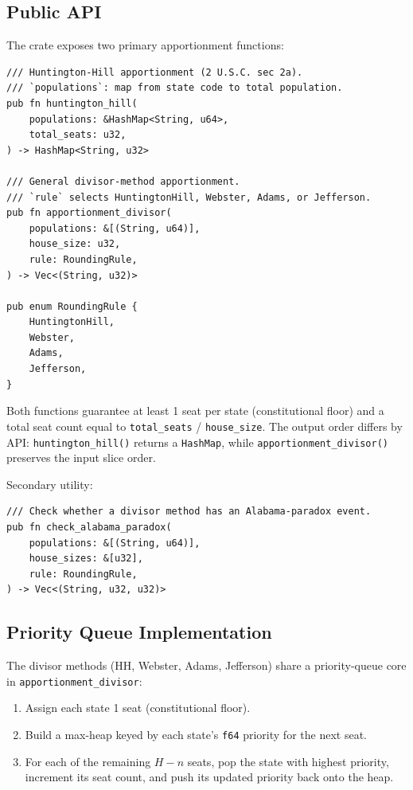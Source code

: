 \label{sec:architecture}

\subsection{Public API}

The crate exposes two primary apportionment functions:

\begin{verbatim}
/// Huntington-Hill apportionment (2 U.S.C. sec 2a).
/// `populations`: map from state code to total population.
pub fn huntington_hill(
    populations: &HashMap<String, u64>,
    total_seats: u32,
) -> HashMap<String, u32>

/// General divisor-method apportionment.
/// `rule` selects HuntingtonHill, Webster, Adams, or Jefferson.
pub fn apportionment_divisor(
    populations: &[(String, u64)],
    house_size: u32,
    rule: RoundingRule,
) -> Vec<(String, u32)>

pub enum RoundingRule {
    HuntingtonHill,
    Webster,
    Adams,
    Jefferson,
}
\end{verbatim}

Both functions guarantee at least 1 seat per state (constitutional floor)
and a total seat count equal to \texttt{total\_seats} / \texttt{house\_size}.
The output order differs by API: \texttt{huntington\_hill()} returns a
\texttt{HashMap}, while \texttt{apportionment\_divisor()} preserves the input
slice order.

Secondary utility:

\begin{verbatim}
/// Check whether a divisor method has an Alabama-paradox event.
pub fn check_alabama_paradox(
    populations: &[(String, u64)],
    house_sizes: &[u32],
    rule: RoundingRule,
) -> Vec<(String, u32, u32)>
\end{verbatim}

\subsection{Priority Queue Implementation}

The divisor methods (HH, Webster, Adams, Jefferson) share a
priority-queue core in \texttt{apportionment\_divisor}:

\begin{enumerate}
  \item Assign each state 1 seat (constitutional floor).
  \item Build a max-heap keyed by each state's \texttt{f64} priority
    for the next seat.
  \item For each of the remaining $H - n$ seats, pop the state with
    highest priority, increment its seat count, and push its updated
    priority back onto the heap.
\end{enumerate}

